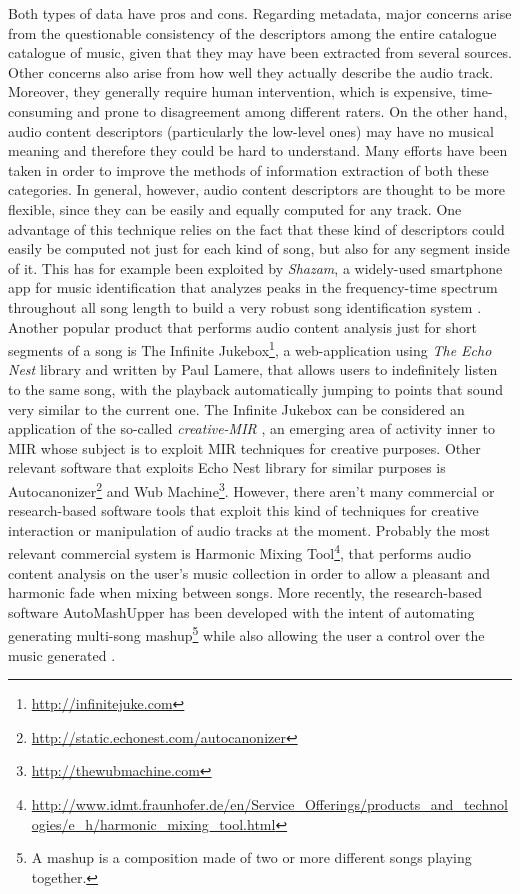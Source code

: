 Both types of data have pros and cons. Regarding metadata, major concerns arise from the questionable consistency of the descriptors among the entire catalogue catalogue of music, given that they may have been extracted from several sources. Other concerns also arise from how well they actually describe the audio track. Moreover, they generally require human intervention, which is expensive, time-consuming and prone to disagreement among different raters. On the other hand, audio content descriptors (particularly the low-level ones) may have no musical meaning and therefore they could be hard to understand. Many efforts have been taken in order to improve the methods of information extraction of both these categories. In general, however, audio content descriptors are thought to be more flexible, since they can be easily and equally computed for any track. One advantage of this technique relies on the fact that these kind of descriptors could easily be computed not just for each kind of song, but also for any segment inside of it. This has for example been exploited by \textit{Shazam}, a widely-used smartphone app for music identification that analyzes peaks in the frequency-time spectrum throughout all song length to build a very robust song identification system \cite{shazam03}. Another popular product that performs audio content analysis just for short segments of a song is The Infinite Jukebox\footnote{\url{http://infinitejuke.com}}, a web-application using \textit{The Echo Nest} library and written by Paul Lamere, that allows users to indefinitely listen to the same song, with the playback automatically jumping to points that sound very similar to the current one. The Infinite Jukebox can be considered an application of the so-called \textit{creative-MIR} \cite{xavier2013}, an emerging area of activity inner to MIR whose subject is to exploit MIR techniques for creative purposes.  Other relevant software that exploits Echo Nest library for similar purposes is Autocanonizer\footnote{\url{http://static.echonest.com/autocanonizer}} and Wub Machine\footnote{\url{http://thewubmachine.com}}. However, there aren't many commercial or research-based software tools that exploit this kind of techniques for creative interaction or manipulation of audio tracks at the moment. Probably the most relevant commercial system is Harmonic Mixing Tool\footnote{\url{http://www.idmt.fraunhofer.de/en/Service_Offerings/products_and_technologies/e_h/harmonic_mixing_tool.html}}, that performs audio content analysis on the user's music collection in order to allow a pleasant and harmonic fade when mixing between songs. More recently, the research-based software AutoMashUpper has been developed with the intent of automating generating multi-song mashup\footnote{A mashup is a composition made of two or more different songs playing together.} while also allowing the user a control over the music generated \cite{automash14}. 

